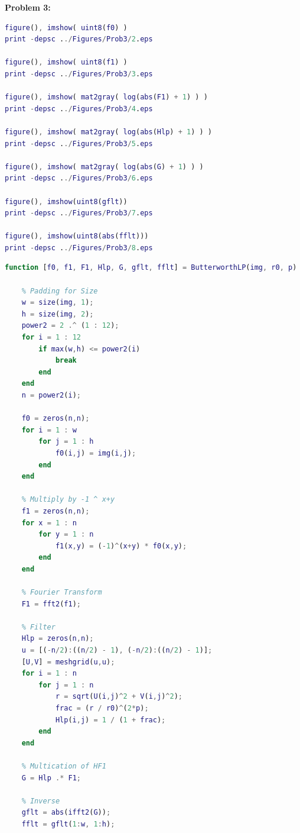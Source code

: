 \documentclass[11pt]{article}
\newenvironment{problem}[1]{\textbf{Problem #1: }}{\newpage}
\begin{document}
\begin{problem}{3}
\begin{enumerate}[label = (\alph*)]
\begin{lstlisting}[language=Matlab]
figure(), imshow( uint8(f0) )
print -depsc ../Figures/Prob3/2.eps

figure(), imshow( uint8(f1) )
print -depsc ../Figures/Prob3/3.eps

figure(), imshow( mat2gray( log(abs(F1) + 1) ) )
print -depsc ../Figures/Prob3/4.eps

figure(), imshow( mat2gray( log(abs(Hlp) + 1) ) )
print -depsc ../Figures/Prob3/5.eps

figure(), imshow( mat2gray( log(abs(G) + 1) ) )
print -depsc ../Figures/Prob3/6.eps

figure(), imshow(uint8(gflt))
print -depsc ../Figures/Prob3/7.eps

figure(), imshow(uint8(abs(fflt)))
print -depsc ../Figures/Prob3/8.eps
\end{lstlisting}
			\newpage
\begin{lstlisting}[language=Matlab]
function [f0, f1, F1, Hlp, G, gflt, fflt] = ButterworthLP(img, r0, p)

	% Padding for Size
	w = size(img, 1);
	h = size(img, 2);
	power2 = 2 .^ (1 : 12);
	for i = 1 : 12
		if max(w,h) <= power2(i)
			break
		end
	end
	n = power2(i);
	
	f0 = zeros(n,n);
	for i = 1 : w
		for j = 1 : h
			f0(i,j) = img(i,j);
		end
	end
	
	% Multiply by -1 ^ x+y
	f1 = zeros(n,n);
	for x = 1 : n
		for y = 1 : n
			f1(x,y) = (-1)^(x+y) * f0(x,y);
		end
	end
	
	% Fourier Transform
	F1 = fft2(f1);
	
	% Filter 
	Hlp = zeros(n,n);
	u = [(-n/2):((n/2) - 1), (-n/2):((n/2) - 1)];
	[U,V] = meshgrid(u,u);
	for i = 1 : n
		for j = 1 : n
			r = sqrt(U(i,j)^2 + V(i,j)^2);
			frac = (r / r0)^(2*p);
			Hlp(i,j) = 1 / (1 + frac);
		end
	end
	
	% Multication of HF1
	G = Hlp .* F1;
	
	% Inverse
	gflt = abs(ifft2(G));
	fflt = gflt(1:w, 1:h);


\end{lstlisting}
\end{enumerate}
\end{problem}
\end{document}
